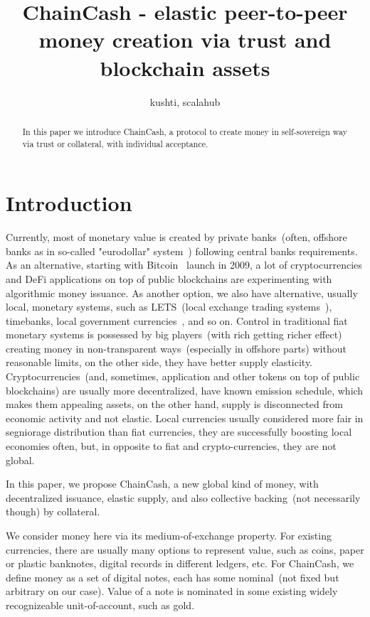 \documentclass{article}   %
\newcommand{\cc}{ChainCash}
\begin{document}
\title{ChainCash - elastic peer-to-peer money creation via trust and blockchain assets}
\author{kushti, scalahub}


\maketitle

\begin{abstract}
In this paper we introduce ChainCash, a protocol to create money in self-sovereign way via trust or collateral, with individual acceptance.
\end{abstract}


\section{Introduction}

Currently, most of monetary value is created by private banks~(often, offshore banks as in so-called "eurodollar" system~\cite{machlup1970euro}) following central banks requirements. As an alternative, starting with Bitcoin~\cite{nakamoto2008peer} launch in 2009, a lot of cryptocurrencies 
and DeFi applications on top of public blockchains are experimenting with algorithmic money issuance. As another option, we also have alternative, usually local, monetary systems, such as LETS~(local exchange trading systems~\cite{williams1996new}), timebanks, local government currencies~\cite{unterguggenbercer1934end}, and so on. Control in traditional fiat monetary systems is possessed by big players~(with rich getting richer effect) creating money in non-transparent ways~(especially in offshore parts) without reasonable limits, on the other side, they have better supply elasticity. Cryptocurrencies~(and, sometimes, application and other tokens on top of public blockchains) are usually more decentralized, have known emission schedule, which makes them appealing assets, on the other hand, supply is disconnected from economic activity and not elastic. Local currencies usually considered more fair in segniorage distribution than fiat currencies, they are successfully boosting local economies often, but, in opposite to fiat and crypto-currencies, they are not global.

In this paper, we propose \cc{}, a new global kind of money, with decentralized issuance, elastic supply, and also collective backing~(not necessarily though) by collateral.


We consider money here via its medium-of-exchange property. For existing currencies, there are usually many options to represent value, such as coins, paper or plastic banknotes, digital records in different ledgers, etc. For \cc{}, we define money as a set of digital notes, each has some nominal~(not fixed but arbitrary on our case). Value of a note is nominated in some existing widely recognizeable unit-of-account, such as gold. 
\end{document}
